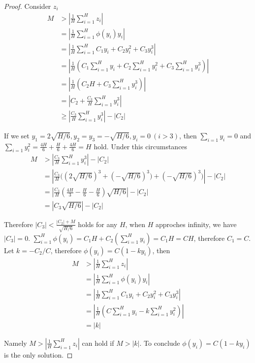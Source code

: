 \documentclass{article}
\begin{document}
\begin{proof}
Consider $z_i$
\begin{equation}\begin{aligned}
M&>|\frac{1}{H}\sum_{i=1}^Hz_i|\\
&=|\frac{1}{H}\sum_{i=1}^H\phi(y_i)y_i|\\
&=|\frac{1}{H}\sum_{i=1}^HC_1y_i+C_2y_i^2+C_3y_i^3|\\
&=|\frac{1}{H}(C_1\sum_{i=1}^Hy_i+C_2\sum_{i=1}^Hy_i^2+C_3\sum_{i=1}^Hy_i^3)|\\
&=|\frac{1}{H}(C_2H+C_3\sum_{i=1}^Hy_i^3)|\\
&=|C_2+\frac{C_3}{H}\sum_{i=1}^Hy_i^3|\\
&\ge |\frac{C_3}{H}\sum_{i=1}^Hy_i^3|-|C_2|
\end{aligned}\end{equation}

If we set $y_1=2\sqrt{H/6}, y_2=y_3=-\sqrt{H/6}, y_i=0\ (i>3)$, then $\sum_{i=1}y_i=0$ and $\sum_{i=1}y_i^2=\frac{4H}{6}+\frac{H}{6}+\frac{4H}{6}=H$ hold. Under this circumstances
\begin{equation}\begin{aligned}
M&>|\frac{C_3}{H}\sum_{i=1}^Hy_i^3|-|C_2|\\
&=|\frac{C_3}{H}\big((2\sqrt{H/6})^3+(-\sqrt{H/6})^3)+(-\sqrt{H/6})^3\big)|-|C_2|\\
&=|\frac{C_3}{H}(\frac{4H}{3}-\frac{H}{6}-\frac{H}{6})\sqrt{H/6}|-|C_2|\\
&=|{C_3}\sqrt{H/6}|-|C_2|
\end{aligned}\end{equation}

Therefore $|C_3|<\frac{|C_2|+M}{\sqrt{H/6}}$ holds for any $H$, when $H$ approches infinity, we have $|C_3|=0$.
$\sum\limits_{i=1}^H\phi(y_i)=C_1H+C_2(\sum\limits_{i=1}^Hy_i)=C_1H=CH$, therefore $C_1=C$. Let $k=-C_2/C$, therefore $\phi(y_i)=C(1-ky_i)$, then
\begin{equation}\begin{aligned}
M&>|\frac{1}{H}\sum_{i=1}^Hz_i|\\
&=|\frac{1}{H}\sum_{i=1}^H\phi(y_i)y_i|\\
&=|\frac{1}{H}\sum_{i=1}^HC_1y_i+C_2y_i^2+C_3y_i^3|\\
&=|\frac{1}{H}(C\sum_{i=1}^Hy_i-k\sum_{i=1}^Hy_i^2)|\\
&=|k|
\end{aligned}\end{equation}

Namely $M>|\frac{1}{H}\sum\limits_{i=1}^Hz_i|$ can hold if $M>|k|$. To conclude $\phi(y_i)=C(1-ky_i)$ is the only solution.
\end{proof}
\end{document}
